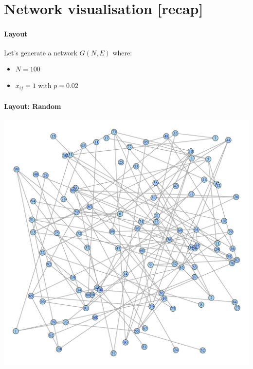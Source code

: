 \documentclass[8pt]{beamer}
\begin{document}
\section{Network visualisation [recap]}

\bgroup
{}
\begin{frame}[plain]{}
\begin{center}
\color{white}{\Huge\insertsection}
\end{center}
\end{frame}
\egroup


\begin{frame}
\frametitle{\insertsection}
\framesubtitle{Layout}

Let's generate a network $G(N, E)$ where:
\begin{itemize}
\item $N=100$
\item $x_{ij} = 1$ with $p=0.02$
\end{itemize}
 
\end{frame}


\begin{frame}
\frametitle{\insertsection}
\framesubtitle{Layout: Random}

\centering
\includegraphics[height=0.85\textheight]{random}

\end{frame}
\end{document}
